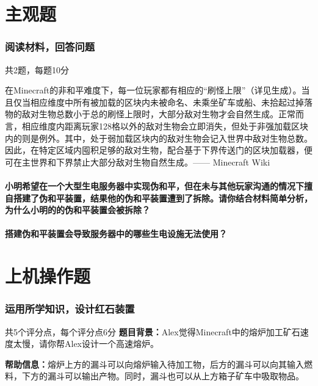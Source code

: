 \documentclass{exampaper}
\begin{document}
        \clearpage

    \part{主观题}
        \section{阅读材料，回答问题}{共2题，每题10分}
            \begin{material}
                在Minecraft的非和平难度下，每一位玩家都有相应的“刷怪上限”（详见生成）。当且仅当相应维度中所有被加载的区块内未被命名、未乘坐矿车或船、未拾起过掉落物的敌对生物总数小于总的刷怪上限时，大部分敌对生物才会自然生成。正常而言，相应维度内距离玩家128格以外的敌对生物会立即消失，但处于非强加载区块内的则是例外。其中，处于弱加载区块内的敌对生物会记入世界中敌对生物总数。因此，在特定区域内囤积足够的敌对生物，配合基于下界传送门的区块加载器，便可在主世界和下界禁止大部分敌对生物自然生成。—— Minecraft Wiki
            \end{material}

            \subsection{小明希望在一个大型生电服务器中实现伪和平，但在未与其他玩家沟通的情况下擅自搭建了伪和平装置，结果他的伪和平装置遭到了拆除。请你结合材料简单分析，为什么小明的的伪和平装置会被拆除？}
                \vspace{2cm}
            
            \subsection{搭建伪和平装置会导致服务器中的哪些生电设施无法使用？}
                \vspace{2cm}
        
    \part{上机操作题}
        \section{运用所学知识，设计红石装置}{共5个评分点，每个评分点6分}
            \textbf{题目背景：}Alex觉得Minecraft中的熔炉加工矿石速度太慢，请你帮Alex设计一个高速熔炉。

            \textbf{帮助信息：}熔炉上方的漏斗可以向熔炉输入待加工物，后方的漏斗可以向其输入燃料，下方的漏斗可以输出产物。同时，漏斗也可以从上方箱子矿车中吸取物品。
\end{document}
